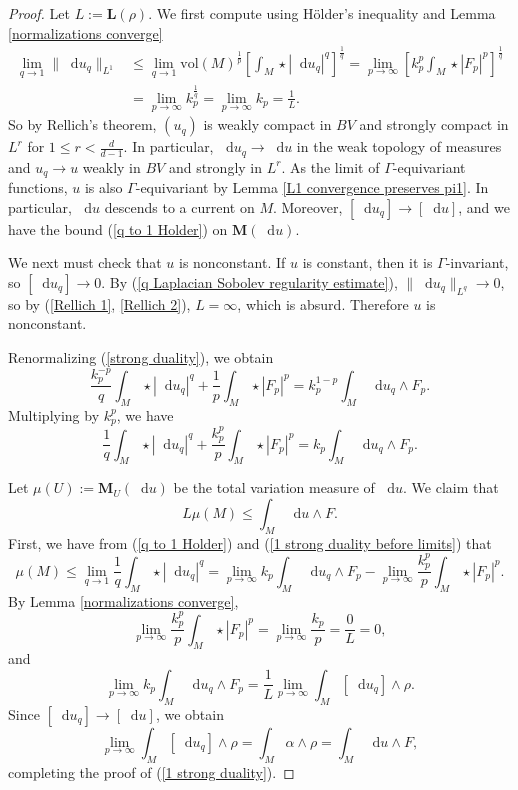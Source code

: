 \documentclass[reqno,11pt]{amsart}
\newcommand*\dif{\mathop{}\!\mathrm{d}}
\newcommand{\vol}{\mathrm{vol}}
\newcommand{\Mass}{\mathbf M}
\newcommand{\Comass}{\mathbf L}
\theoremstyle{definition}
\numberwithin{equation}{section}
\begin{document}
\begin{proof}
Let $L := \Comass(\rho)$.
We first compute using H\"older's inequality and Lemma \ref{normalizations converge}
\begin{align}
\lim_{q \to 1} \|\dif u_q\|_{L^1}
&\leq \lim_{q \to 1} \vol(M)^{\frac{1}{p}} \left[\int_M \star |\dif u_q|^q\right]^{\frac{1}{q}} = \lim_{p \to \infty} \left[k_p^p \int_M \star |F_p|^p\right]^{\frac{1}{q}} \label{Rellich 1}\\
&= \lim_{p \to \infty} k_p^{\frac{1}{q}} = \lim_{p \to \infty} k_p = \frac{1}{L} \label{Rellich 2}.
\end{align}
So by Rellich's theorem, $(u_q)$ is weakly compact in $BV$ and strongly compact in $L^r$ for $1 \leq r < \frac{d}{d - 1}$.
In particular, $\dif u_q \to \dif u$ in the weak topology of measures and $u_q \to u$ weakly in $BV$ and strongly in $L^r$.
As the limit of $\Gamma$-equivariant functions, $u$ is also $\Gamma$-equivariant by Lemma \ref{L1 convergence preserves pi1}.
In particular, $\dif u$ descends to a current on $M$.
Moreover, $[\dif u_q] \to [\dif u]$, and we have the bound (\ref{q to 1 Holder}) on $\Mass(\dif u)$.

We next must check that $u$ is nonconstant.
If $u$ is constant, then it is $\Gamma$-invariant, so $[\dif u_q] \to 0$.
By (\ref{q Laplacian Sobolev regularity estimate}), $\|\dif u_q\|_{L^q} \to 0$, so by (\ref{Rellich 1}, \ref{Rellich 2}), $L = \infty$, which is absurd.
Therefore $u$ is nonconstant.

Renormalizing (\ref{strong duality}), we obtain 
$$\frac{k_p^{-p}}{q} \int_M \star |\dif u_q|^q + \frac{1}{p} \int_M \star |F_p|^p = k_p^{1 - p} \int_M \dif u_q \wedge F_p.$$
Multiplying by $k_p^p$, we have 
\begin{equation}\label{1 strong duality before limits}
	\frac{1}{q} \int_M \star |\dif u_q|^q + \frac{k_p^p}{p} \int_M \star |F_p|^p = k_p \int_M \dif u_q \wedge F_p.
\end{equation}

Let $\mu(U) := \Mass_U(\dif u)$ be the total variation measure of $\dif u$.
We claim that
\begin{equation}\label{1 strong duality}
	L\mu(M) \leq \int_M \dif u \wedge F.
\end{equation}
First, we have from (\ref{q to 1 Holder}) and (\ref{1 strong duality before limits}) that
$$\mu(M) \leq \lim_{q \to 1} \frac{1}{q} \int_M \star |\dif u_q|^q = \lim_{p \to \infty} k_p \int_M \dif u_q \wedge F_p - \lim_{p \to \infty} \frac{k_p^p}{p} \int_M \star |F_p|^p.$$
By Lemma \ref{normalizations converge},
$$\lim_{p \to \infty} \frac{k_p^p}{p} \int_M \star |F_p|^p = \lim_{p \to \infty} \frac{k_p}{p} = \frac{0}{L} = 0,$$
and
$$\lim_{p \to \infty} k_p \int_M \dif u_q \wedge F_p = \frac{1}{L} \lim_{p \to \infty} \int_M [\dif u_q] \wedge \rho.$$
Since $[\dif u_q] \to [\dif u]$, we obtain
$$\lim_{p \to \infty} \int_M [\dif u_q] \wedge \rho = \int_M \alpha \wedge \rho = \int_M \dif u \wedge F,$$
completing the proof of (\ref{1 strong duality}).


\end{proof}
\end{document}
